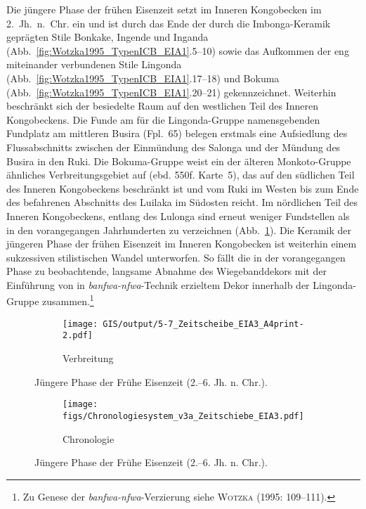 Die jüngere Phase der frühen Eisenzeit setzt im Inneren Kongobecken im 2.~Jh.~n.~Chr. ein und ist durch das Ende der durch die Imbonga-Keramik geprägten Stile Bonkake, Ingende und Inganda (Abb.~\ref{fig:Wotzka1995_TypenICB_EIA1}.5--10) sowie das Aufkommen der eng miteinander verbundenen Stile Lingonda (Abb.~\ref{fig:Wotzka1995_TypenICB_EIA1}.17--18) und Bokuma (Abb.~\ref{fig:Wotzka1995_TypenICB_EIA1}.20--21) gekennzeichnet. Weiterhin beschränkt sich der besiedelte Raum auf den westlichen Teil des Inneren Kongobeckens. Die Funde am für die Lingonda-Gruppe namensgebenden Fundplatz am mittleren Busira (Fpl.~65) belegen erstmals eine Aufsiedlung des Flussabschnitts zwischen der Einmündung des Salonga und der Mündung des Busira in den Ruki. Die Bokuma-Gruppe \parencite[556f. Karte~8]{Wotzka.1995} weist ein der älteren Monkoto-Gruppe ähnliches Verbreitungsgebiet auf (ebd. 550f. Karte~5), das auf den südlichen Teil des Inneren Kongobeckens beschränkt ist und vom Ruki im Westen bis zum Ende des befahrenen Abschnitts des Luilaka im Südosten reicht. Im nördlichen Teil des Inneren Kongobeckens, entlang des Lulonga sind erneut weniger Fundstellen als in den vorangegangen Jahrhunderten zu verzeichnen (Abb.~\ref{fig:EIA3_Karte}). Die Keramik der jüngeren Phase der frühen Eisenzeit im Inneren Kongobecken ist weiterhin einem sukzessiven stilistischen Wandel unterworfen. So fällt die in der vorangegangen Phase zu beobachtende, langsame Abnahme des Wiegebanddekors mit der Einführung von in \textit{banfwa-nfwa}-Technik erzieltem Dekor innerhalb der Lingonda-Gruppe zusammen.\footnote{Zu Genese der \textit{banfwa-nfwa}-Verzierung siehe \textsc{Wotzka} (1995: 109--111).}

\begin{figure*}[p]
	\centering
	\begin{subfigure}[b]{\textwidth}
		\centering
		\texttt{[image: GIS/output/5-7\_Zeitscheibe\_EIA3\_A4print-2.pdf]}
		\vspace{2cm}
		\caption{Verbreitung}
		\label{fig:EIA3_Karte}
	\end{subfigure}
	\caption{Jüngere Phase der Frühe Eisenzeit (2.--6. Jh. n. Chr.).}
	\label{}
\end{figure*}
\addtocounter{figure}{-1}
\begin{figure*}[p]
	\begin{subfigure}[b]{\textwidth}
		\setcounter{subfigure}{1}
		\centering
		\texttt{[image: figs/Chronologiesystem\_v3a\_Zeitschiebe\_EIA3.pdf]}
		\caption{Chronologie}
		\label{fig:EIA3_Chronologie}
	\end{subfigure}
	\caption{Jüngere Phase der Frühe Eisenzeit (2.--6. Jh. n. Chr.).}
	\label{fig:EIA3}
\end{figure*}

